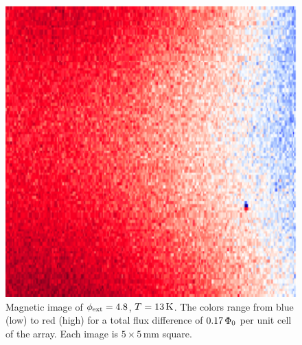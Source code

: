\begin{figure}[p]
\includegraphics[width=5.7in]{figs/pme_exp/fig3_5_c_lg.ps}
\caption[Magnetic image of $\phiext = 4.8$, $T=13\,\kelvin$.]{
Magnetic image of $\phiext = 4.8$, $T=13\,\kelvin$.
The colors range from blue (low) to red (high) for 
a total flux difference of $0.17\,\Phi_0$ per unit cell of the
array. Each image is $5\times 5\,\mathrm{mm}$ square.}
\label{fig:pme_scanning_passes_c}
\end{figure}

